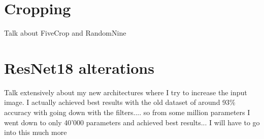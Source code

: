 \begin{table}[h]
    \caption{Accuracy (\%) for several learning rates and lr-decays for CNN\_Basic as a baseline.}
    \centering
    \begin{small}
    \textsc{
    }
    \end{small}
    \vspace{-3.9mm}
    \label{tbl:cnn-basic-baseline}
\end{table}

\section{Cropping}

Talk about FiveCrop and RandomNine

\section{ResNet18 alterations}

Talk extensively about my new architectures where I try to increase the input image. I actually achieved best results with the old dataset of around 93\% accuracy with going down with the filters.... so from some million parameters I went  down to only 40'000 parameters and achieved best results... I will have to go into this much more